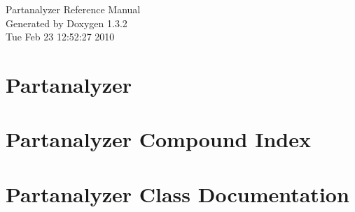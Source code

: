 \documentclass[a4paper]{book}
\begin{document}
\begin{titlepage}
\vspace*{7cm}
\begin{center}
{\Large Partanalyzer Reference Manual}\\
\vspace*{1cm}
{\large Generated by Doxygen 1.3.2}\\
\vspace*{0.5cm}
{\small Tue Feb 23 12:52:27 2010}\\
\end{center}
\end{titlepage}
\clearemptydoublepage
{}
\tableofcontents
\clearemptydoublepage
{}
\chapter{Partanalyzer }
\label{index}
\chapter{Partanalyzer Compound Index}

\chapter{Partanalyzer Class Documentation}













\printindex
\end{document}
